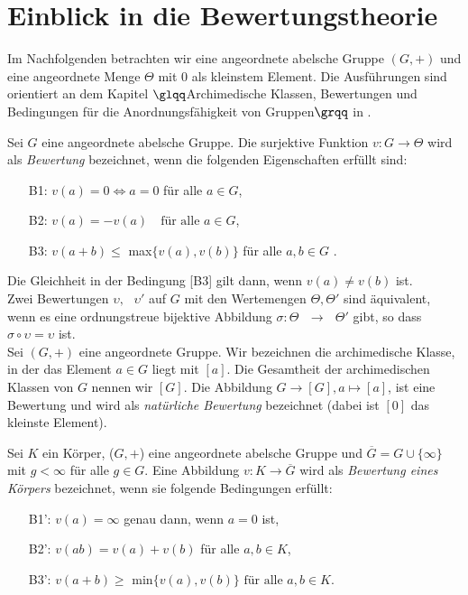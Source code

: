 \section{Einblick in die Bewertungstheorie}
Im Nachfolgenden betrachten wir eine angeordnete abelsche Gruppe $\left(G,+\right)$ und eine angeordnete Menge $\Theta$ mit $0$ als kleinstem Element. Die Ausführungen sind orientiert an dem Kapitel $\glqq$Archimedische Klassen, Bewertungen und Bedingungen für die Anordnungsfähigkeit von Gruppen$\grqq$ in \cite[S. 9 - 11]{priesscrampe83}.
%
%
\begin{defn} %
Sei $G$ eine angeordnete abelsche Gruppe. Die surjektive Funktion $v\colon G \rightarrow \Theta$ wird als \textit{Bewertung} bezeichnet, wenn die folgenden Eigenschaften erfüllt sind:
%
\begin{enumerate}
\item[B1:] $v{(a)} = 0 \Leftrightarrow a = 0$ für alle $a\in G$,
\item[B2:]  $v{(a)} = -v{(a)} \text{  } \text{ für alle } a \in G $,
\item[B3:] $ v{(a+ b)} \le$ max$\{v{(a)}, v{(b)}\}$ für alle $ a, b \in G$ .
\end{enumerate}
%
\end{defn}
Die Gleichheit in der Bedingung [B3] gilt dann, wenn $v{(a)} \ne v{(b)} $ ist.\\
 Zwei Bewertungen $\upsilon, \text{ } \upsilon' $ auf $G$ mit den Wertemengen $\Theta , \Theta' $ sind äquivalent, wenn es eine ordnungstreue bijektive Abbildung $\sigma \colon \Theta \text{ } \rightarrow \text{ } \Theta' $ gibt, so dass $ \sigma \circ \upsilon = \upsilon  $ ist.\\
Sei $\left(G, +\right)$ eine angeordnete Gruppe. Wir bezeichnen die archimedische Klasse, in der das Element $a\in G$ liegt  mit $[a]$. Die Gesamtheit der archimedischen Klassen von $G$ nennen wir $[G]$. Die Abbildung $G \to [G], a \mapsto [a]$, ist eine Bewertung und wird als \textit{natürliche Bewertung} bezeichnet (dabei ist $[0]$ das kleinste Element). %
%
%
%
%
%
%
%
%
%
%
\begin{defn}  \label{bewKoerper} %
Sei $K$ ein Körper, ($G, +$) eine angeordnete abelsche Gruppe und $\overline{G}  = G \cup \lbrace\infty\rbrace $ mit $g< \infty$ für alle $g \in G$. Eine Abbildung $v\colon K \to \overline{G} $ wird als \textit{Bewertung eines Körpers} bezeichnet, wenn sie folgende Bedingungen erfüllt:
\begin{enumerate}
\item[B1':] $v(a) = \infty$ genau dann, wenn $a = 0$ ist,
\item[B2':] $v(ab) = v\left(a\right)+v\left(b\right) $ für alle $ a, b \in K$,
\item[B3':] $v\left(a+b\right) \ge $ min$\lbrace v(a),v\left(b \right)\rbrace \text{ für alle }  a, b \in K. $
\end{enumerate}
\end{defn}

